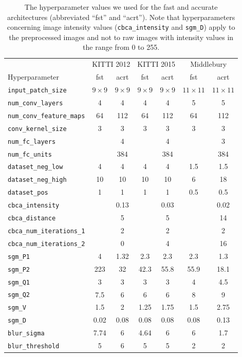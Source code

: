 \documentclass[twoside,11pt]{article}
\begin{document}
\begin{table}[tb]
\begin{center}
\begin{tabular}{l ccc ccc}\toprule

& \multicolumn{2}{c}{KITTI 2012} &
\multicolumn{2}{c}{KITTI 2015} &
\multicolumn{2}{c}{Middlebury} \\
\cmidrule(lr){2-3}
\cmidrule(lr){4-5}
\cmidrule(lr){6-7}
Hyperparameter & fst & acrt & fst & acrt & fst & acrt \\\midrule
\texttt{input\_patch\_size} & \( 9 \times 9 \) & \( 9 \times 9 \) & \( 9 \times 9 \) & \( 9 \times 9 \) & \( 11 \times 11 \) & \( 11 \times 11 \) \\
\texttt{num\_conv\_layers} & 4 & 4 & 4 & 4 & 5 & 5 \\
\texttt{num\_conv\_feature\_maps} & 64 & 112 & 64 & 112 & 64 & 112\\
\texttt{conv\_kernel\_size} & 3 & 3 & 3 & 3 & 3 & 3 \\
\texttt{num\_fc\_layers} & & 4 & & 4 & & 3 \\
\texttt{num\_fc\_units} & & 384 & & 384 & & 384 \\
\texttt{dataset\_neg\_low} & 4 & 4 & 4 & 4 & 1.5 & 1.5 \\
\texttt{dataset\_neg\_high} & 10 & 10 & 10 & 10 & 6 & 18 \\
\texttt{dataset\_pos} & 1 & 1 & 1 & 1 & 0.5 & 0.5 \\
\texttt{cbca\_intensity} & & 0.13 & & 0.03 & & 0.02 \\
\texttt{cbca\_distance} & & 5 & & 5 & & 14 \\
\texttt{cbca\_num\_iterations\_1} & & 2 & & 2 & & 2 \\
\texttt{cbca\_num\_iterations\_2} & & 0 & & 4 & & 16 \\
\texttt{sgm\_P1} & 4 & 1.32 & 2.3 & 2.3 & 2.3 & 1.3 \\
\texttt{sgm\_P2} & 223 & 32 & 42.3 & 55.8 & 55.9 & 18.1 \\
\texttt{sgm\_Q1} & 3 & 3 & 3 & 3 & 4 & 4.5 \\
\texttt{sgm\_Q2} & 7.5 & 6 & 6 & 6 & 8 & 9 \\
\texttt{sgm\_V} & 1.5 & 2 & 1.25 & 1.75 & 1.5 & 2.75 \\
\texttt{sgm\_D} & 0.02 & 0.08 & 0.08 & 0.08 & 0.08 & 0.13 \\
\texttt{blur\_sigma} & 7.74 & 6 & 4.64 & 6 & 6 & 1.7 \\
\texttt{blur\_threshold} & 5 & 6 & 5 & 5 & 2 & 2 \\\bottomrule

\end{tabular}
\caption{The hyperparameter values we used for the fast and accurate
architectures (abbreviated ``fst'' and ``acrt'').  Note that hyperparameters
concerning image intensity values (\texttt{cbca\_intensity} and
\texttt{sgm\_D}) apply to the preprocessed images and not to raw images with
intensity values in the range from 0 to 255. }

\label{tbl:hyperparameters_default}
\end{center}
\end{table}
\end{document}
